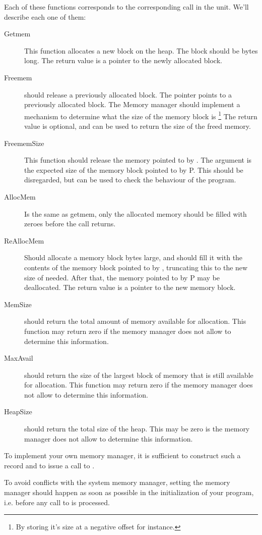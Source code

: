 {Each of these functions corresponds to the corresponding call in the 
unit. We'll describe each one of them:
\begin{description}
\item[Getmem] This function allocates a new block on the heap. The block
should be  bytes long. The return value is a pointer to the newly
allocated block.
\item[Freemem] should release a previously allocated block. The pointer
 points to a previously allocated block. The Memory manager should
implement a mechanism to determine what the size of the memory block is
\footnote{By storing it's size at a negative offset for instance.} The
return value is optional, and can be used to return the size of the freed
memory.
\item[FreememSize] This function should release the memory pointed to by
. The argument  is the expected size of the memory block
pointed to by P. This should be disregarded, but can be used to check the
behaviour of the program.
\item[AllocMem] Is the same as getmem, only the allocated memory should
be filled with zeroes before the call returns.
\item[ReAllocMem] Should allocate a memory block  bytes large,
and should fill it with the contents of the memory block pointed to by
, truncating this to the new size of needed. After that, the memory
pointed to by P may be deallocated. The return value is a pointer to the
new memory block.
\item[MemSize] should return the total amount of memory available for
allocation. This function may return zero if the memory manager does not
allow to determine this information.
\item[MaxAvail] should return the size of the largest block of memory that
is still available for allocation. This function may return zero if the
memory manager does not allow to determine this information.
\item[HeapSize] should return the total size of the heap. This may be zero
is the memory manager does not allow to determine this information.
\end{description}
To implement your own memory manager, it is sufficient to construct such a
record and to issue a call to .

To avoid conflicts with the system memory manager, setting the memory
manager should happen as soon as possible in the initialization of your
program, i.e. before any call to  is processed.

}
